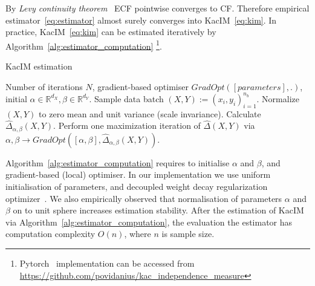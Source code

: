 \documentclass{article}
\begin{document}
{\noindent By \textit{Levy continuity theorem}~\cite{KacTheorem} ECF pointwise converges to CF. Therefore empirical estimator~\eqref{eq:estimator} almost surely converges into KacIM~\eqref{eq:kim}. In practice, KacIM~\eqref{eq:kim} can be estimated iteratively by Algorithm~\ref{alg:estimator_computation} \footnote{Pytorch~\cite{NEURIPS2019_9015} implementation can be accessed from \url{https://github.com/povidanius/kac_independence_measure}}. 


\begin{algorithm}
	\caption{KacIM estimation}\label{alg:estimator_computation}
	\begin{algorithmic}
		\Require Number of iterations $N$, gradient-based optimiser $GradOpt([parameters],.)$, initial $\alpha \in \mathbb{R}^{d_{X}}, \beta \in \mathbb{R}^{d_{Y}}$.
		\State Sample data batch $(X,Y):=(x_{i},y_{i})_{i=1}^{n_{b}}$.
		\State Normalize $(X,Y)$ to zero mean and unit variance (scale invariance).
		\State Calculate  $\widehat{\Delta}_{\alpha, \beta}(X,Y)$.
		\State Perform one maximization iteration of $\widehat{\Delta}(X,Y)$ via $\alpha, \beta \rightarrow GradOpt([\alpha, \beta], \widehat{\Delta}_{\alpha, \beta}(X,Y))$.
		\EndFor
	\end{algorithmic}
\end{algorithm}



Algorithm~\ref{alg:estimator_computation} requires to initialise $\alpha$ and $\beta$, and gradient-based (local) optimiser. In our implementation we use uniform initialisation of parameters, and decoupled weight decay regularization optimizer~\cite{Loshchilov2019DecoupledWD}. 
We also empirically observed that normalisation of parameters $\alpha$ and $\beta$ on to unit sphere increases estimation stability. After the estimation of KacIM via Algorithm~\ref{alg:estimator_computation}, the evaluation the estimator  has computation complexity $O(n)$, where $n$ is sample size.



}
\end{document}
